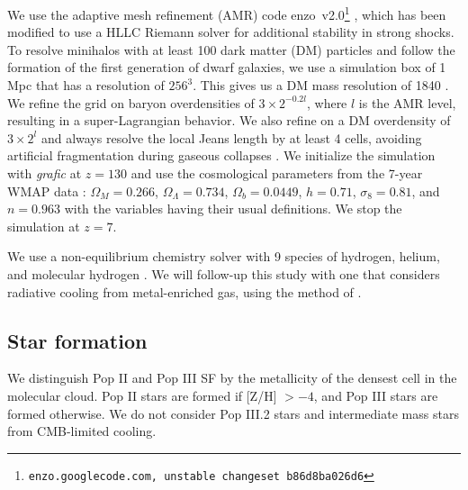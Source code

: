 \documentclass[12pt]{article}
\newcommand{\Ms}{\ifmmode{M_\odot}\else{$M_\odot$}\fi}
\begin{document}
We use the adaptive mesh refinement (AMR) code
enzo~v2.0\footnote{\texttt{enzo.googlecode.com, unstable changeset
b86d8ba026d6}} \cite{BryanNorman1997, OShea2004}, which has been modified to
use a HLLC Riemann solver \cite{Toro94_HLLC} for additional stability in strong
shocks.  To resolve minihalos with at least 100 dark matter (DM) particles and
follow the formation of the first generation of dwarf galaxies, we use a
simulation box of 1 Mpc that has a resolution of $256^3$.  This gives us a DM
mass resolution of 1840 \Ms.  We refine the grid on baryon overdensities of $3
\times 2^{-0.2l}$, where $l$ is the AMR level, resulting in a super-Lagrangian
behavior.  We also refine on a DM overdensity of $3 \times 2^l$ and always
resolve the local Jeans length by at least 4 cells, avoiding artificial
fragmentation during gaseous collapses \cite{Truelove97}.  We initialize the
simulation with \textsl{grafic} \cite{Bertschinger01} at $z = 130$ and use the
cosmological parameters from the 7-year WMAP data \cite{WMAP7}: $\Omega_M =
0.266$, $\Omega_\Lambda = 0.734$, $\Omega_b = 0.0449$, $h = 0.71$, $\sigma_8 =
0.81$, and $n = 0.963$ with the variables having their usual definitions.  We
stop the simulation at $z=7$.

We use a non-equilibrium chemistry solver with 9 species of hydrogen,
helium, and molecular hydrogen \cite{Abel97}.  We will follow-up this
study with one that considers radiative cooling from metal-enriched
gas, using the method of \cite{2008MNRAS.385.1443S}.


\subsection*{Star formation}

We distinguish Pop II and Pop III SF by the metallicity of the densest
cell in the molecular cloud.  Pop II stars are formed if [Z/H] $> -4$,
and Pop III stars are formed otherwise.  We do not consider Pop III.2
stars and intermediate mass stars from CMB-limited cooling.
\end{document}

